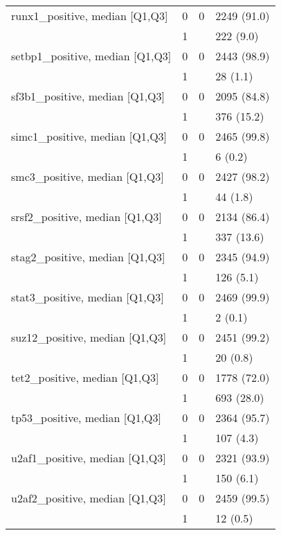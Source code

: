 \begin{tabular}{llll}
runx1\_positive, median [Q1,Q3] & 0 &      0 &       2249 (91.0) \\
                 & 1 &        &         222 (9.0) \\
setbp1\_positive, median [Q1,Q3] & 0 &      0 &       2443 (98.9) \\
                 & 1 &        &          28 (1.1) \\
sf3b1\_positive, median [Q1,Q3] & 0 &      0 &       2095 (84.8) \\
                 & 1 &        &        376 (15.2) \\
simc1\_positive, median [Q1,Q3] & 0 &      0 &       2465 (99.8) \\
                 & 1 &        &           6 (0.2) \\
smc3\_positive, median [Q1,Q3] & 0 &      0 &       2427 (98.2) \\
                 & 1 &        &          44 (1.8) \\
srsf2\_positive, median [Q1,Q3] & 0 &      0 &       2134 (86.4) \\
                 & 1 &        &        337 (13.6) \\
stag2\_positive, median [Q1,Q3] & 0 &      0 &       2345 (94.9) \\
                 & 1 &        &         126 (5.1) \\
stat3\_positive, median [Q1,Q3] & 0 &      0 &       2469 (99.9) \\
                 & 1 &        &           2 (0.1) \\
suz12\_positive, median [Q1,Q3] & 0 &      0 &       2451 (99.2) \\
                 & 1 &        &          20 (0.8) \\
tet2\_positive, median [Q1,Q3] & 0 &      0 &       1778 (72.0) \\
                 & 1 &        &        693 (28.0) \\
tp53\_positive, median [Q1,Q3] & 0 &      0 &       2364 (95.7) \\
                 & 1 &        &         107 (4.3) \\
u2af1\_positive, median [Q1,Q3] & 0 &      0 &       2321 (93.9) \\
                 & 1 &        &         150 (6.1) \\
u2af2\_positive, median [Q1,Q3] & 0 &      0 &       2459 (99.5) \\
                 & 1 &        &          12 (0.5) \\

\end{tabular}
